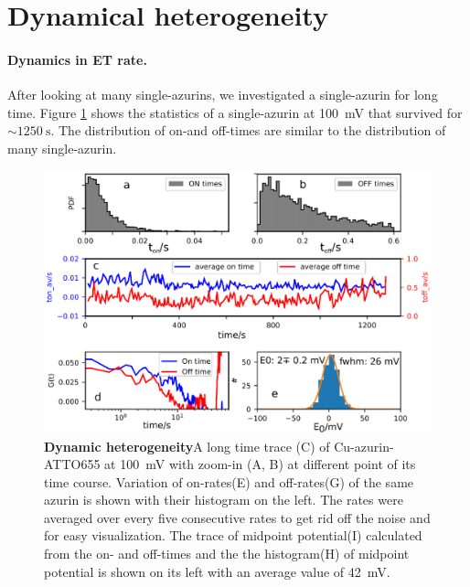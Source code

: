 \documentclass[journal=jacsat,manuscript=article]{achemso}
\begin{document}
\section{Dynamical heterogeneity}
\paragraph*{Dynamics in ET rate.}
After looking at many single-azurins, we investigated a single-azurin for long time. 
Figure \ref{fig:long_azurin_trace} shows the statistics of a single-azurin at \SI{100}{\mV} that survived for ${\sim}\SI{1250}{\s}$.
The distribution of on-and off-times are similar to the distribution of many single-azurin.
\begin{figure}
	\centering
	\includegraphics{long_azurin_trace}
	\caption{\textbf{Dynamic heterogeneity}A long time trace (C) of Cu-azurin-ATTO655 at \SI{100}{\mV} with zoom-in (A, B) at different point of its time course.
	Variation of on-rates(E) and off-rates(G) of the same azurin is shown with their histogram on the left.
	The rates were averaged over every five consecutive rates to get rid off the noise and for easy visualization.
	The trace of midpoint potential(I) calculated from the on- and off-times and the the histogram(H) of midpoint potential is shown on its left with an average value of \SI{42}{\mV}.
	}
	\label{fig:long_azurin_trace}
\end{figure}
\end{document}
